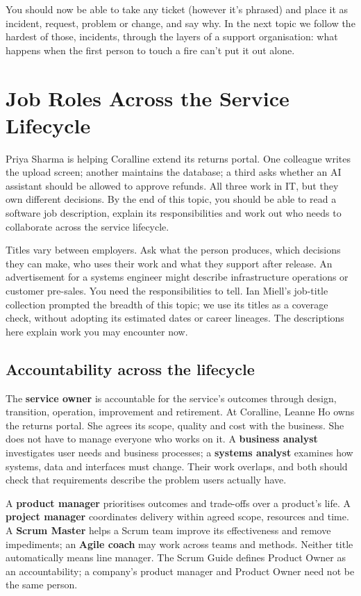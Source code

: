 You should now be able to take any ticket (however it's phrased) and place it as incident, request, problem or change, and say why. In the next topic we follow the hardest of those, incidents, through the layers of a support organisation: what happens when the first person to touch a fire can't put it out alone.

\section{Job Roles Across the Service Lifecycle}
Priya Sharma is helping Coralline extend its returns portal. One colleague writes the upload screen; another maintains the database; a third asks whether an AI assistant should be allowed to approve refunds. All three work in IT, but they own different decisions. By the end of this topic, you should be able to read a software job description, explain its responsibilities and work out who needs to collaborate across the service lifecycle.


Titles vary between employers. Ask what the person produces, which decisions they can make, who uses their work and what they support after release. An advertisement for a systems engineer might describe infrastructure operations or customer pre-sales. You need the responsibilities to tell. Ian Miell's job-title collection prompted the breadth of this topic; we use its titles as a coverage check, without adopting its estimated dates or career lineages. The descriptions here explain work you may encounter now. \autocite{miell-job-titles}



\subsection{Accountability across the lifecycle}


The \textbf{service owner} is accountable for the service's outcomes through design, transition, operation, improvement and retirement. At Coralline, Leanne Ho owns the returns portal. She agrees its scope, quality and cost with the business. She does not have to manage everyone who works on it. A \textbf{business analyst} investigates user needs and business processes; a \textbf{systems analyst} examines how systems, data and interfaces must change. Their work overlaps, and both should check that requirements describe the problem users actually have.


A \textbf{product manager} prioritises outcomes and trade-offs over a product's life. A \textbf{project manager} coordinates delivery within agreed scope, resources and time. A \textbf{Scrum Master} helps a Scrum team improve its effectiveness and remove impediments; an \textbf{Agile coach} may work across teams and methods. Neither title automatically means line manager. The Scrum Guide defines Product Owner as an accountability; a company's product manager and Product Owner need not be the same person. \autocite{scrum-guide-roles}


